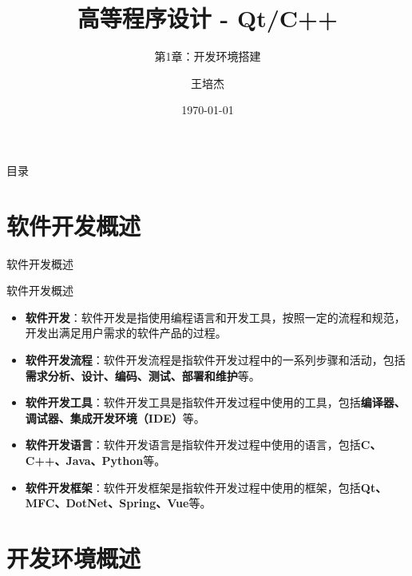 \documentclass[UTF8,aspectratio=169]{beamer}
\title{高等程序设计 - Qt/C++}
\subtitle{第1章：开发环境搭建}
\author{王培杰}
\institute{长江大学地球物理与石油资源学院}
\date{\today}
\begin{document}
\begin{frame}
    \titlepage
\end{frame}

\begin{frame}{目录}
    \begin{multicols}{2}
        \tableofcontents[]
    \end{multicols}
\end{frame}

\section{软件开发概述}

\begin{frame}{软件开发概述}
    \begin{ytublock}{软件开发概述}
        \begin{itemize}
            \item \textbf{软件开发}：软件开发是指使用编程语言和开发工具，按照一定的流程和规范，开发出满足用户需求的软件产品的过程。
            \item \textbf{软件开发流程}：软件开发流程是指软件开发过程中的一系列步骤和活动，包括\textbf{需求分析、设计、编码、测试、部署和维护}等。
            \item \textbf{软件开发工具}：软件开发工具是指软件开发过程中使用的工具，包括\textbf{编译器、调试器、集成开发环境（IDE）}等。
            \item \textbf{软件开发语言}：软件开发语言是指软件开发过程中使用的语言，包括\textbf{C、C++、Java、Python}等。
            \item \textbf{软件开发框架}：软件开发框架是指软件开发过程中使用的框架，包括\textbf{Qt、MFC、DotNet、Spring、Vue}等。
        \end{itemize}
    \end{ytublock}
\end{frame}

\section{开发环境概述}
\end{document}
